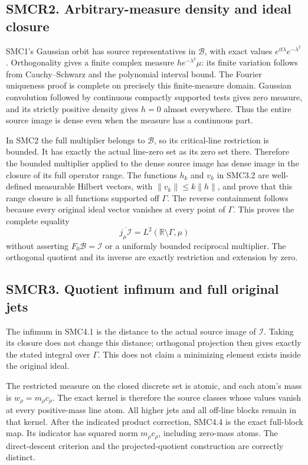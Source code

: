 \subsection{SMCR2. Arbitrary-measure density and ideal
closure}\label{smcr2.-arbitrary-measure-density-and-ideal-closure}

SMC1's Gaussian orbit has source representatives in \(\mathcal B\), with
exact values \(e^{it\lambda}e^{-\lambda^2}\). Orthogonality gives a
finite complex measure \(h e^{-\lambda^2}\mu\): its finite variation
follows from Cauchy--Schwarz and the polynomial interval bound. The
Fourier uniqueness proof is complete on precisely this finite-measure
domain. Gaussian convolution followed by continuous compactly supported
tests gives zero measure, and its strictly positive density gives
\(h=0\) almost everywhere. Thus the entire source image is dense even
when the measure has a continuous part.

In SMC2 the full multiplier belongs to \(\mathcal B\), so its
critical-line restriction is bounded. It has exactly the actual
line-zero set as its zero set there. Therefore the bounded multiplier
applied to the dense source image has dense image in the closure of its
full operator range. The functions \(h_k\) and \(v_k\) in SMC3.2 are
well-defined measurable Hilbert vectors, with \(\|v_k\|\le k\|h\|\), and
prove that this range closure is all functions supported off \(\Gamma\).
The reverse containment follows because every original ideal vector
vanishes at every point of \(\Gamma\). This proves the complete equality
\[
\overline{j_\mu\mathcal I}=L^2(\mathbb R\setminus\Gamma,\mu)
\] without asserting \(F_0\mathcal B=\mathcal I\) or a uniformly bounded
reciprocal multiplier. The orthogonal quotient and its inverse are
exactly restriction and extension by zero.

\subsection{SMCR3. Quotient infimum and full original
jets}\label{smcr3.-quotient-infimum-and-full-original-jets}

The infimum in SMC4.1 is the distance to the actual source image of
\(\mathcal I\). Taking its closure does not change this distance;
orthogonal projection then gives exactly the stated integral over
\(\Gamma\). This does not claim a minimizing element exists inside the
original ideal.

The restricted measure on the closed discrete set is atomic, and each
atom's mass is \(w_\rho=m_\rho c_\rho\). The exact kernel is therefore
the source classes whose values vanish at every positive-mass line atom.
All higher jets and all off-line blocks remain in that kernel. After the
indicated product correction, SMC4.4 is the exact full-block map. Its
indicator has squared norm \(m_\rho c_\rho\), including zero-mass atoms.
The direct-descent criterion and the projected-quotient construction are
correctly distinct.

